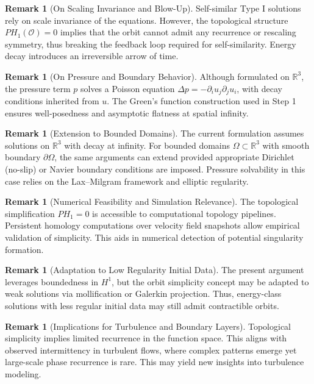 \documentclass[11pt]{article}
\theoremstyle{definition}
\newtheorem{remark}[theorem]{Remark}
\begin{document}
\begin{remark}[On Scaling Invariance and Blow-Up]
Self-similar Type I solutions rely on scale invariance of the equations. However, the topological structure \( PH_1(\mathcal{O}) = 0 \) implies that the orbit cannot admit any recurrence or rescaling symmetry, thus breaking the feedback loop required for self-similarity. Energy decay introduces an irreversible arrow of time.
\end{remark}

\begin{remark}[On Pressure and Boundary Behavior]
Although formulated on \( \mathbb{R}^3 \), the pressure term \( p \) solves a Poisson equation \( \Delta p = -\partial_i u_j \partial_j u_i \), with decay conditions inherited from \( u \). The Green's function construction used in Step 1 ensures well-posedness and asymptotic flatness at spatial infinity.
\end{remark}

\begin{remark}[Extension to Bounded Domains]
The current formulation assumes solutions on \( \mathbb{R}^3 \) with decay at infinity. For bounded domains \( \Omega \subset \mathbb{R}^3 \) with smooth boundary \( \partial\Omega \), the same arguments can extend provided appropriate Dirichlet (no-slip) or Navier boundary conditions are imposed. Pressure solvability in this case relies on the Lax–Milgram framework and elliptic regularity.
\end{remark}

\begin{remark}[Numerical Feasibility and Simulation Relevance]
The topological simplification \( PH_1 = 0 \) is accessible to computational topology pipelines. Persistent homology computations over velocity field snapshots allow empirical validation of simplicity. This aids in numerical detection of potential singularity formation.
\end{remark}

\begin{remark}[Adaptation to Low Regularity Initial Data]
The present argument leverages boundedness in \( H^1 \), but the orbit simplicity concept may be adapted to weak solutions via mollification or Galerkin projection. Thus, energy-class solutions with less regular initial data may still admit contractible orbits.
\end{remark}

\begin{remark}[Implications for Turbulence and Boundary Layers]
Topological simplicity implies limited recurrence in the function space. This aligns with observed intermittency in turbulent flows, where complex patterns emerge yet large-scale phase recurrence is rare. This may yield new insights into turbulence modeling.
\end{remark}
\end{document}
